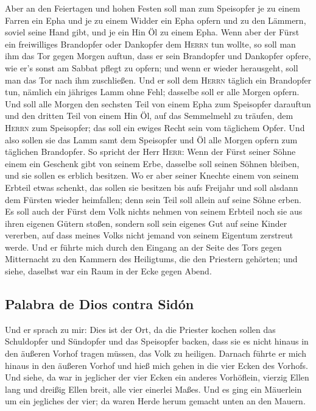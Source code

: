  Aber an den Feiertagen und hohen Festen soll man zum
Speisopfer je zu einem Farren ein Epha und je zu einem Widder ein Epha
opfern und zu den Lämmern, soviel seine Hand gibt, und je ein Hin Öl zu
einem Epha.  Wenn aber der Fürst ein freiwilliges
Brandopfer oder Dankopfer dem \textsc{Herrn} tun wollte, so soll man ihm
das Tor gegen Morgen auftun, dass er sein Brandopfer und Dankopfer
opfere, wie er's sonst am Sabbat pflegt zu opfern; und wenn er wieder
herausgeht, soll man das Tor nach ihm zuschließen.  Und
er soll dem \textsc{Herrn} täglich ein Brandopfer tun, nämlich ein
jähriges Lamm ohne Fehl; dasselbe soll er alle Morgen opfern.
 Und soll alle Morgen den sechsten Teil von einem Epha
zum Speisopfer darauftun und den dritten Teil von einem Hin Öl, auf das
Semmelmehl zu träufen, dem \textsc{Herrn} zum Speisopfer; das soll ein
ewiges Recht sein vom täglichem Opfer.  Und also sollen
sie das Lamm samt dem Speisopfer und Öl alle Morgen opfern zum täglichen
Brandopfer.  So spricht der Herr \textsc{Herr}: Wenn der
Fürst seiner Söhne einem ein Geschenk gibt von seinem Erbe, dasselbe
soll seinen Söhnen bleiben, und sie sollen es erblich besitzen.
 Wo er aber seiner Knechte einem von seinem Erbteil etwas
schenkt, das sollen sie besitzen bis aufs Freijahr und soll alsdann dem
Fürsten wieder heimfallen; denn sein Teil soll allein auf seine Söhne
erben.  Es soll auch der Fürst dem Volk nichts nehmen von
seinem Erbteil noch sie aus ihren eigenen Gütern stoßen, sondern soll
sein eigenes Gut auf seine Kinder vererben, auf dass meines Volks nicht
jemand von seinem Eigentum zerstreut werde.  Und er
führte mich durch den Eingang an der Seite des Tors gegen Mitternacht zu
den Kammern des Heiligtums, die den Priestern gehörten; und siehe,
daselbst war ein Raum in der Ecke gegen Abend.

\hypertarget{palabra-de-dios-contra-siduxf3n}{%
\subsection{Palabra de Dios contra
Sidón}\label{palabra-de-dios-contra-siduxf3n}}

 Und er sprach zu mir: Dies ist der Ort, da die Priester
kochen sollen das Schuldopfer und Sündopfer und das Speisopfer backen,
dass sie es nicht hinaus in den äußeren Vorhof tragen müssen, das Volk
zu heiligen.  Darnach führte er mich hinaus in den
äußeren Vorhof und hieß mich gehen in die vier Ecken des Vorhofs.
 Und siehe, da war in jeglicher der vier Ecken ein
anderes Vorhöflein, vierzig Ellen lang und dreißig Ellen breit, alle
vier einerlei Maßes.  Und es ging ein Mäuerlein um ein
jegliches der vier; da waren Herde herum gemacht unten an den Mauern.

